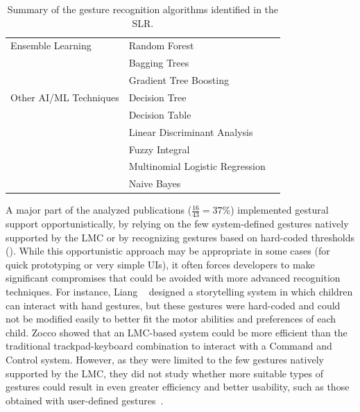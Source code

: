 \begin{table}[!b]
{\begin{tabular}{lll}
        \midrule
        Ensemble Learning & Random Forest & \cite{Marin:2016,Schioppo:2019} \\
         & Bagging Trees & \cite{Jiang:2018} \\
         & Gradient Tree Boosting & \cite{Kiselev:2019} \\
        \midrule
        Other AI/ML Techniques & Decision Tree & \cite{Filho:2018,Stinghen:2018,Zhou:2018b} \\
         & Decision Table & \cite{Li:2017c} \\
         & Linear Discriminant Analysis & \cite{Jiang:2018} \\
         & Fuzzy Integral & \cite{Li:2017c} \\
         & Multinomial Logistic Regression & \cite{Kiselev:2019} \\
         & Naive Bayes & \cite{Preventis:2014} \\
        \bottomrule
    \end{tabular}
    }
    \caption{Summary of the gesture recognition algorithms identified in the SLR.}
    \label{tbl:state_of_the_art:lmc:algorithms}
\end{table}

A major part of the analyzed publications ($\frac{16}{43}{=}37\%$) implemented gestural support opportunistically, \ie by relying on the few system-defined gestures natively supported by the LMC or by recognizing gestures based on hard-coded thresholds (\eg \cite{Cai:2019,Galea:2018,Zhou:2018b}). While this opportunistic approach may be appropriate in some cases (\eg for quick prototyping\cite{Anthony:2012} or very simple UIs), it often forces developers to make significant compromises that could be avoided with more advanced recognition techniques. For instance, Liang \etal~\cite{Liang:2017} designed a storytelling system in which children can interact with hand gestures, but these gestures were hard-coded and could not be modified easily to better fit the motor abilities and preferences of each child. Zocco \etal\cite{Zocco:2015} showed that an LMC-based system could be more efficient than the traditional trackpad-keyboard combination to interact with a Command and Control system. However, as they were limited to the few gestures natively supported by the LMC, they did not study whether more suitable types of gestures could result in even greater efficiency and better usability, such as those obtained with user-defined gestures~\cite{Grijincu:2014}.

